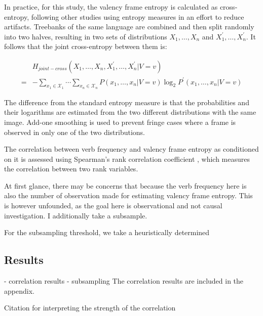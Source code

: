 In practice, for this study, the valency frame entropy is calculated as cross-entropy, following other studies using entropy measures \citep{hahn2021} in an effort to reduce artifacts. Treebanks of the same language are combined and then split randomly into two halves, resulting in two sets of distributions $X_1,\ldots,X_n$ and $X_1^{\prime},\ldots,X_n^{\prime}$. It follows that the joint cross-entropy between them is:

\begin{equation*}
  \begin{split}
   & H_{joint-cross}(X_{1},\ldots,X_{n},X_{1}^{\prime},\ldots,X_{n}^{\prime}|V=v)\\
  =& -\sum\limits_{x_1\in{}\mathcal{X}_1}\cdots\sum\limits_{x_n\in{}\mathcal{X}_n}{P(x_1,\ldots,x_{n}|V=v)\log_{2}P^{\prime}(x_1,\ldots,x_n|V=v)}
  \end{split}
\end{equation*}
  
The difference from the standard entropy measure is that the probabilities and their logarithms are estimated from the two different distributions with the same image. Add-one smoothing is used to prevent fringe cases where a frame is observed in only one of the two distributions.

The correlation between verb frequency and valency frame entropy as conditioned on it is assessed using Spearman's rank correlation coefficient \citep{spearman1904}, which measures the correlation between two rank variables. 

At first glance, there may be concerns that because the verb frequency here is also the number of observation made for estimating valency frame entropy. This is however unfounded, as the goal here is observational and not causal investigation.  I additionally take a subsample.

For the subsampling threshold, we take a heuristically determined 

\subsection{Results}

- correlation results - subsampling  
The correlation results are included in the appendix.



Citation for interpreting the strength of the correlation \citep{schober2018}

